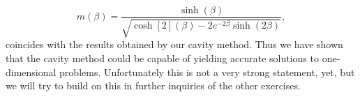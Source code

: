 \documentclass[main.tex]{subfiles}
\begin{document}
\[
    m(\beta) =
    \frac{\sinh( \beta ) }{\sqrt{
            \cosh[2]( \beta ) - 2e^{-2 \beta} \sinh( 2 \beta ) 
    } }
,\] 
coincides with the results obtained by our cavity method.
Thus we have shown that the cavity method could be capable of yielding accurate solutions to one-dimensional problems.
Unfortunately this is not a very strong statement, yet, but we will try to build on this in further inquiries of the other exercises.

\ifSubfilesClassLoaded{
    \newpage
    \printbibliography
}{
    \newpage
}
\end{document}

